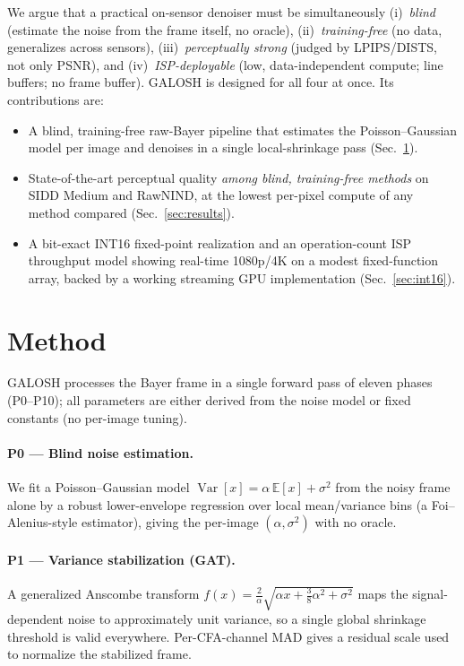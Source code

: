 \documentclass[10pt,twocolumn]{article}
\begin{document}
We argue that a practical on-sensor denoiser must be simultaneously
(i)~\emph{blind} (estimate the noise from the frame itself, no oracle),
(ii)~\emph{training-free} (no data, generalizes across sensors),
(iii)~\emph{perceptually strong} (judged by LPIPS/DISTS, not only PSNR), and
(iv)~\emph{ISP-deployable} (low, data-independent compute; line buffers; no frame
buffer). GALOSH is designed for all four at once. Its contributions are:
\begin{itemize}\itemsep2pt
\item A blind, training-free raw-Bayer pipeline that estimates the
Poisson--Gaussian model per image and denoises in a single local-shrinkage pass
(Sec.~\ref{sec:method}).
\item State-of-the-art perceptual quality \emph{among blind, training-free
methods} on SIDD Medium and RawNIND, at the lowest per-pixel compute of any
method compared (Sec.~\ref{sec:results}).
\item A bit-exact INT16 fixed-point realization and an operation-count ISP
throughput model showing real-time 1080p/4K on a modest fixed-function array,
backed by a working streaming GPU implementation (Sec.~\ref{sec:int16}).
\end{itemize}

\section{Method}\label{sec:method}
GALOSH processes the Bayer frame in a single forward pass of eleven phases
(P0--P10); all parameters are either derived from the noise model or fixed
constants (no per-image tuning).

\paragraph{P0 --- Blind noise estimation.}
We fit a Poisson--Gaussian model $\operatorname{Var}[x]=\alpha\,\mathbb{E}[x]+
\sigma^2$ from the noisy frame alone by a robust lower-envelope regression over
local mean/variance bins (a Foi--Alenius-style estimator), giving the per-image
$(\alpha,\sigma^2)$ with no oracle.

\paragraph{P1 --- Variance stabilization (GAT).}
A generalized Anscombe transform $f(x)=\tfrac{2}{\alpha}\sqrt{\alpha x+\tfrac38
\alpha^2+\sigma^2}$ maps the signal-dependent noise to approximately unit
variance, so a single global shrinkage threshold is valid everywhere. Per-CFA-channel
MAD gives a residual scale used to normalize the stabilized frame.
\end{document}
